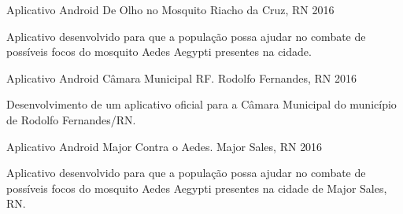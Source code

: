 

\begin{cventries}

  \cventry
    {Aplicativo Android} %
    {De Olho no Mosquito} %
    {Riacho da Cruz, RN} %
    {2016} %
    {
      \begin{cvitems} %
        \item {Aplicativo desenvolvido para que a população possa ajudar no combate de possíveis focos do mosquito Aedes Aegypti presentes na cidade.}
      \end{cvitems}
    }

  \cventry
    {Aplicativo Android} %
    {Câmara Municipal RF.} %
    {Rodolfo Fernandes, RN} %
    {2016} %
    {
      \begin{cvitems} %
        \item {Desenvolvimento de um aplicativo oficial para a Câmara Municipal do município de Rodolfo Fernandes/RN.}
      \end{cvitems}
    }

  \cventry
    {Aplicativo Android} %
    {Major Contra o Aedes.} %
    {Major Sales, RN} %
    {2016} %
    {
      \begin{cvitems} %
        \item {Aplicativo desenvolvido para que a população possa ajudar no combate de possíveis focos do mosquito Aedes Aegypti presentes na cidade de Major Sales, RN.}
      \end{cvitems}
    }

\end{cventries}
